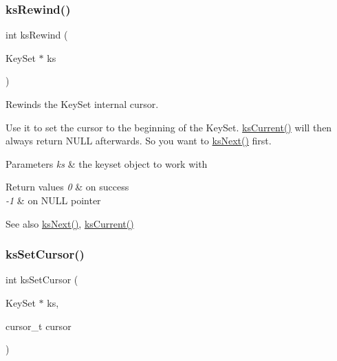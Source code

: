 \subsubsection{\texorpdfstring{ksRewind()}{ksRewind()}}
{\footnotesize\ttfamily int ks\+Rewind (\begin{DoxyParamCaption}\item[{Key\+Set $\ast$}]{ks }\end{DoxyParamCaption})}



Rewinds the Key\+Set internal cursor. 

Use it to set the cursor to the beginning of the Key\+Set. \mbox{\hyperlink{group__keyset_ga4287b9416912c5f2ab9c195cb74fb094}{ks\+Current()}} will then always return N\+U\+LL afterwards. So you want to \mbox{\hyperlink{group__keyset_ga317321c9065b5a4b3e33fe1c399bcec9}{ks\+Next()}} first.


\begin{DoxyCode}{0}
\end{DoxyCode}



\begin{DoxyParams}{Parameters}
{\em ks} & the keyset object to work with \\
\hline
\end{DoxyParams}

\begin{DoxyRetVals}{Return values}
{\em 0} & on success \\
\hline
{\em -\/1} & on N\+U\+LL pointer \\
\hline
\end{DoxyRetVals}
\begin{DoxySeeAlso}{See also}
\mbox{\hyperlink{group__keyset_ga317321c9065b5a4b3e33fe1c399bcec9}{ks\+Next()}}, \mbox{\hyperlink{group__keyset_ga4287b9416912c5f2ab9c195cb74fb094}{ks\+Current()}} 
\end{DoxySeeAlso}
\mbox{\label{group__keyset_gad94c9ffaa3e8034564c0712fd407c345}} 
\subsubsection{\texorpdfstring{ksSetCursor()}{ksSetCursor()}}
{\footnotesize\ttfamily int ks\+Set\+Cursor (\begin{DoxyParamCaption}\item[{Key\+Set $\ast$}]{ks,  }\item[{cursor\+\_\+t}]{cursor }\end{DoxyParamCaption})}



